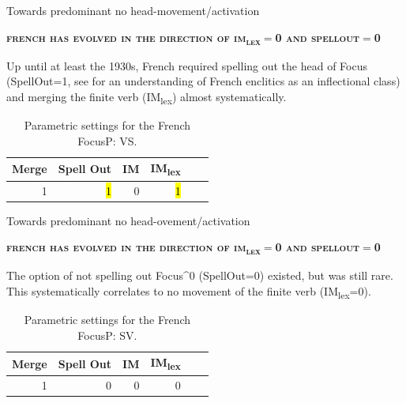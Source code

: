 \documentclass[lesson_slides]{subfiles}
\begin{document}
\begin{frame}[c]{Towards predominant no head-movement/activation}

    \textbf{\textsc{french has evolved in the direction of im\textsubscript{lex}$=$0 and spellout$=$0}}

    \noindent Up until at least the 1930s, French required spelling out the head of Focus (SpellOut=1, see \cite{roberts2017} for an understanding of French enclitics as an inflectional class) and merging the finite verb (IM\textsubscript{lex}) almost systematically.

    \begin{table}[H]
        \centering
        \begin{tabular}{|r|r|r|r|r|r|}
        \hline
        Merge & Spell Out & IM  & IM\textsubscript{lex} \\
        \hline
        1 & \hl{1} & 0 & \hl{1} \\
        \hline
        \end{tabular}
        \caption{\label{tab:samp}Parametric settings for the French FocusP: VS.}
    \end{table}
  
\end{frame}
\begin{frame}[c]{Towards predominant no head-ovement/activation}

    \vspace*{-10mm}
    \textbf{\textsc{french has evolved in the direction of im\textsubscript{lex}$=$0 and spellout$=$0}} \pause

\noindent The option of not spelling out Focus^0 (SpellOut=0) existed, but was still rare. This systematically correlates to no movement of the finite verb (IM\textsubscript{lex}=0). \pause

\begin{table}[H]
    \centering
    \begin{tabular}{|r|r|r|r|r|r|}
    \hline
    Merge & Spell Out & IM & IM\textsubscript{lex} \\
    \hline
    1 & 0 & 0 & 0 \\
    \hline
    \end{tabular}
    \caption{\label{tab:samp}Parametric settings for the French FocusP: SV.}
\end{table}
  
\end{frame}
\end{document}
